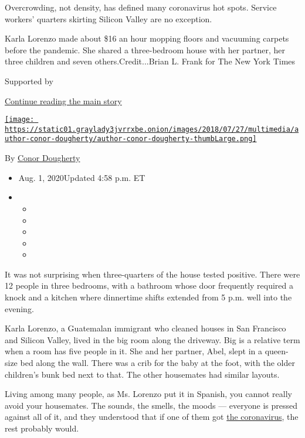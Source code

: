 Overcrowding, not density, has defined many coronavirus hot spots.
Service workers' quarters skirting Silicon Valley are no exception.

Karla Lorenzo made about \$16 an hour mopping floors and vacuuming
carpets before the pandemic. She shared a three-bedroom house with her
partner, her three children and seven others.Credit...Brian L. Frank for
The New York Times

Supported by

\protect\hyperlink{after-sponsor}{Continue reading the main story}

\href{https://www.nytimes3xbfgragh.onion/by/conor-dougherty}{\texttt{[image: https://static01.graylady3jvrrxbe.onion/images/2018/07/27/multimedia/author-conor-dougherty/author-conor-dougherty-thumbLarge.png]}}

By \href{https://www.nytimes3xbfgragh.onion/by/conor-dougherty}{Conor
Dougherty}

\begin{itemize}
\item
  Aug. 1, 2020Updated 4:58 p.m. ET
\item
  \begin{itemize}
  \item
  \item
  \item
  \item
  \item
  \end{itemize}
\end{itemize}

It was not surprising when three-quarters of the house tested positive.
There were 12 people in three bedrooms, with a bathroom whose door
frequently required a knock and a kitchen where dinnertime shifts
extended from 5 p.m. well into the evening.

Karla Lorenzo, a Guatemalan immigrant who cleaned houses in San
Francisco and Silicon Valley, lived in the big room along the driveway.
Big is a relative term when a room has five people in it. She and her
partner, Abel, slept in a queen-size bed along the wall. There was a
crib for the baby at the foot, with the older children's bunk bed next
to that. The other housemates had similar layouts.

Living among many people, as Ms. Lorenzo put it in Spanish, you cannot
really avoid your housemates. The sounds, the smells, the moods ---
everyone is pressed against all of it, and they understood that if one
of them got
\href{https://www.nytimes3xbfgragh.onion/news-event/coronavirus}{the
coronavirus}, the rest probably would.


